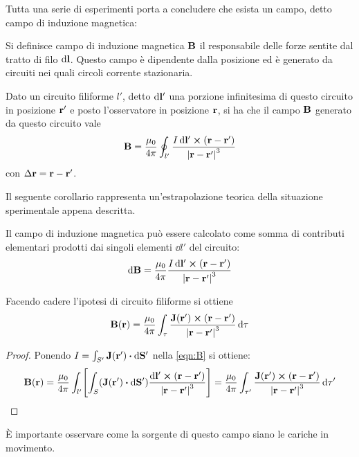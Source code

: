 Tutta una serie di esperimenti porta a concludere che esista un campo, detto campo di induzione magnetica:
\begin{defn}
    Si definisce campo di induzione magnetica $\vb{B}$ il responsabile delle forze sentite
    dal tratto di filo $\dd{\vb{l}}$. Questo campo è dipendente dalla posizione ed è
    generato da circuiti nei quali circoli corrente stazionaria.
\end{defn}
\begin{obses}
    Dato un circuito filiforme $l'$, detto $\dd{\vb{l'}}$ una porzione infinitesima di questo circuito
    in posizione $\vb{r'}$
    e posto l'osservatore in posizione $\vb{r}$, si ha che il campo $\vb{B}$ generato da questo circuito vale
    \begin{equation}
        \label{eqn:B}
        \vb{B}=\frac{\mu_0}{4\pi}\oint_{l'}\frac{I\dd{\vb{l'}}\cp(\vb{r}-\vb{r}')}{\abs{\vb{r}-\vb{r}'}^3}
    \end{equation}
    con $\Delta \vb{r}=\vb{r}-\vb{r'}$.
\end{obses}

Il seguente corollario rappresenta un'estrapolazione teorica della situazione sperimentale appena descritta.
\begin{cor}
    Il campo di induzione magnetica può essere calcolato come somma di contributi elementari prodotti
    dai singoli elementi $\dd{l'}$ del circuito:
    \begin{equation}
        \label{eqn:dB}
        \dd{\vb{B}}=\frac{\mu_0}{4\pi}\frac{I\dd{\vb{l'}}\cp(\vb{r}-\vb{r}')}{\abs{\vb{r}-\vb{r}'}^3}
    \end{equation}
\end{cor}

\begin{cor}
    Facendo cadere l'ipotesi di circuito filiforme si ottiene
    \begin{equation}
        \label{eqn:prima_laplace_non_filiforme}
        \vb{B}(\vb{r})=\frac{\mu_0}{4\pi}\int_{\tau}\frac{\vb{J}(\vb{r'})\cp(\vb{r}-\vb{r}')}{\abs{\vb{r}-\vb{r}'}^3}\dd{\tau}
    \end{equation}
\end{cor}
\begin{proof}
    Ponendo $I=\int_{S'}\vb{J}(\vb{r'})\vdot\dd{\vb{S'}}$ nella \eqref{eqn:B} si ottiene:
    \[
        \vb{B}(\vb{r})=\frac{\mu_0}{4\pi}\int_{l'}\Biggl[\int_S (\vb{J}(\vb{r'})\vdot\dd{\vb{S'}}) \frac{\dd{\vb{l'}}\cp(\vb{r}-\vb{r}')}{\abs{\vb{r}-\vb{r}'}^3}\Biggr]=
        \frac{\mu_0}{4\pi}\int_{\tau'}\frac{\vb{J}(\vb{r'})\cp(\vb{r}-\vb{r}')}{\abs{\vb{r}-\vb{r}'}^3}\dd{\tau'}
    \]
\end{proof}
È importante osservare come la sorgente di questo campo siano le cariche in movimento.
